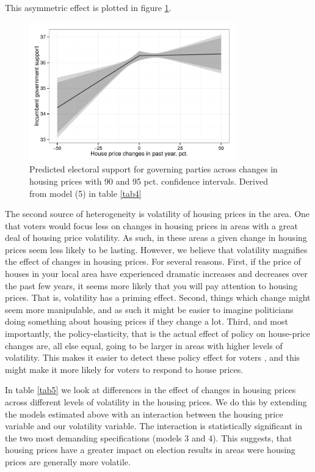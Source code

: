 \documentclass[12pt,a4paper]{article}
\begin{document}


This asymmetric effect is plotted in figure \ref{posneg}.

\begin{figure}[htbp]
	\includegraphics[page=1,width=0.8\textwidth]{../figures/posnegplot}
	\centering
	\caption{Predicted electoral support for governing parties across changes in housing prices with 90 and 95 pct. confidence intervals. Derived from model (5) in table \ref{tab4}}
	\label{posneg}
\end{figure}


The second source of heterogeneity is volatility of housing prices in the area. One that voters would focus less on changes in housing prices in areas with a great deal of housing price volatility. As such, in these areas a given change in housing prices seem less likely to be lasting. However, we believe that volatility magnifies the effect of changes in housing prices. For several reasons. First, if the price of houses in your local area have experienced dramatic increases and decreases  over the past few years, it seems more likely that you will pay attention to housing prices. That is, volatility has a priming effect. Second, things which change might seem more manipulable, and as such it might be easier to imagine politicians doing something about housing prices if they change a lot. Third, and most importantly, the policy-elasticity, that is the actual effect of policy on house-price changes are, all else equal, going to be larger in areas with higher levels of volatility. This makes it easier to detect these policy effect for voters \cite{duch2008economic}, and this might make it more likely for voters to respond to house prices.

In table \ref{tab5} we look at differences in the effect of changes in housing prices across different levels of volatility in the housing prices.  We do this by extending the models estimated above with an interaction between the housing price variable and our volatility variable. The interaction is statistically significant in the two most demanding specifications (models 3 and 4). This suggests, that housing prices have a greater impact on election results in areas were housing prices are generally more volatile. 
\end{document}
